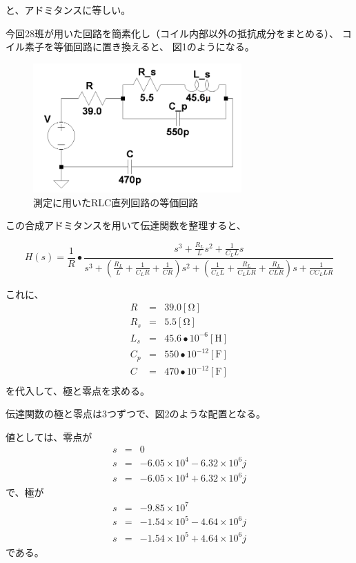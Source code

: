 \documentclass[10pt,a4j,dvipdfmx]{jsarticle}
\begin{document}
と、アドミタンスに等しい。

今回28班が用いた回路を簡素化し（コイル内部以外の抵抗成分をまとめる）、
コイル素子を等価回路に置き換えると、
図1のようになる。

\begin{figure}[H]
  \centering
  \includegraphics[width=8cm]{RLCkettei.png}
  \caption{測定に用いたRLC直列回路の等価回路}
\end{figure}

この合成アドミタンスを用いて伝達関数を整理すると、

\begin{equation}
H(s) = \frac{1}{R} \bullet \frac{s^{3}+\frac{R_{L}}{L}s^{2}+\frac{1}{C_{L}L}s}
{s^{3}
+\left(\frac{R_{L}}{L}+\frac{1}{C_{L}R}+\frac{1}{CR}\right)s^{2}
+\left(\frac{1}{C_{L}L}+\frac{R_{L}}{C_{L}LR}+\frac{R_{L}}{CLR}\right)s
+\frac{1}{CC_{L}LR}
}
\end{equation}

これに、
\begin{eqnarray}
R &=& 39.0\left[\si{\ohm}\right] \\
R_{s} &=& 5.5\left[\si{\ohm}\right] \\
L_{s} &=& 45.6\bullet10^{-6}\left[\si{\henry}\right] \\
C_{p} &=& 550\bullet10^{-12}\left[\si{\farad}\right] \\
C &=& 470\bullet10^{-12}\left[\si{\farad}\right] \\
\end{eqnarray}
を代入して、極と零点を求める。

伝達関数の極と零点は3つずつで、図2のような配置となる。

値としては、零点が
\begin{eqnarray}
s &=& 0 \\
s &=& -6.05×10^4-6.32×10^6 j \\
s &=& -6.05×10^4+6.32×10^6 j
\end{eqnarray}
で、極が
\begin{eqnarray}
s &=& -9.85×10^7 \\
s &=& -1.54×10^5-4.64×10^6 j \\
s &=& -1.54×10^5+4.64×10^6 j
\end{eqnarray}
である。
\end{document}
